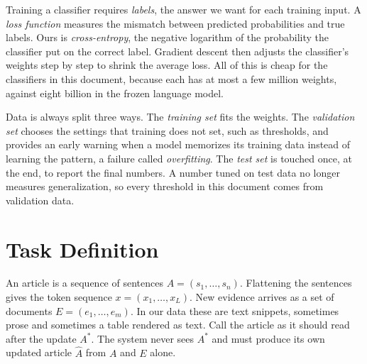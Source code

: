 \documentclass[]{paper}
\begin{document}
Training a classifier requires \emph{labels}, the answer we want for each training input. A \emph{loss function} measures the mismatch between predicted probabilities and true labels. Ours is \emph{cross-entropy}, the negative logarithm of the probability the classifier put on the correct label. Gradient descent then adjusts the classifier's weights step by step to shrink the average loss. All of this is cheap for the classifiers in this document, because each has at most a few million weights, against eight billion in the frozen language model.

Data is always split three ways. The \emph{training set} fits the weights. The \emph{validation set} chooses the settings that training does not set, such as thresholds, and provides an early warning when a model memorizes its training data instead of learning the pattern, a failure called \emph{overfitting}. The \emph{test set} is touched once, at the end, to report the final numbers. A number tuned on test data no longer measures generalization, so every threshold in this document comes from validation data.

\section{Task Definition}
\label{sec:problem}

An article is a sequence of sentences $A = (s_1, \dots, s_n)$. Flattening the sentences gives the token sequence $x = (x_1, \dots, x_L)$. New evidence arrives as a set of documents $E = (e_1, \dots, e_m)$. In our data these are text snippets, sometimes prose and sometimes a table rendered as text. Call the article as it should read after the update $A^\ast$. The system never sees $A^\ast$ and must produce its own updated article $\hat{A}$ from $A$ and $E$ alone.
\end{document}

